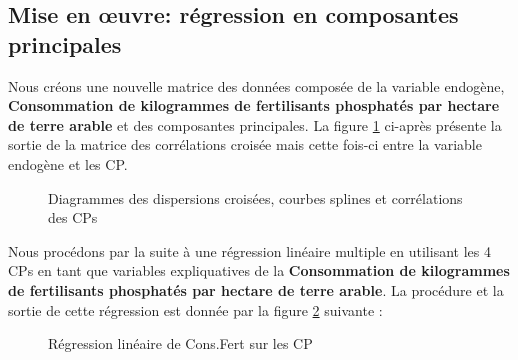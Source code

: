 	\subsection{Mise en œuvre: régression en composantes principales}
	Nous créons une nouvelle matrice des données composée de la variable endogène, \textbf{Consommation de kilogrammes de fertilisants phosphatés par hectare de terre arable} et des composantes principales.
	La figure \ref{fig:scatter2} ci-après présente la sortie de la matrice des corrélations croisée mais cette fois-ci entre la variable endogène et les CP.
				\begin{figure}[H]
					    		\centering
					    		\caption{Diagrammes des dispersions croisées, courbes splines et corrélations des CPs}
					    		\label{fig:scatter2}
				\end{figure}
	Nous procédons par la suite à une régression linéaire multiple en utilisant les 4 CPs en tant que variables expliquatives de la \textbf{Consommation de kilogrammes de fertilisants phosphatés par hectare de terre arable}. La procédure et la sortie de cette régression est donnée par la figure \ref{fig:PCR} suivante :
					\begin{figure}[H]
						    		\centering
						    		\caption{Régression linéaire de Cons.Fert sur les CP}
						    		\label{fig:PCR}
					\end{figure}
